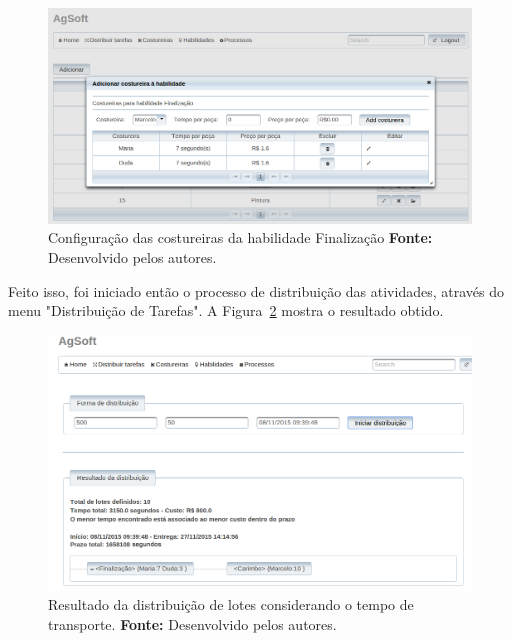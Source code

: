 \begin{figure}[h!]
	\centerline{\includegraphics[width=14cm]{./imagens/cofig_at_finalizaca_teste4.png}}
	\caption[Configuração das costureiras da habilidade Finalização.]
	{Configuração das costureiras da habilidade Finalização \textbf{Fonte:}
	Desenvolvido pelos autores.}
	\label{fig:at_finalizacao_teste4}
\end{figure}



\par Feito isso, foi iniciado então o processo de distribuição das atividades,
através do menu "Distribuição de Tarefas". A Figura~\ref{fig:resultado_transporte_teste4} mostra o resultado obtido.

\newpage

\begin{figure}[h!]
	\centerline{\includegraphics[width=14.7cm]{./imagens/resultado_transporte_teste4.png}}
	\caption[Resultado da distribuição de lotes considerando o tempo de transporte.]
	{Resultado da distribuição de lotes considerando o tempo de transporte. \textbf{Fonte:} Desenvolvido pelos
	autores.}
	\label{fig:resultado_transporte_teste4}
\end{figure}

